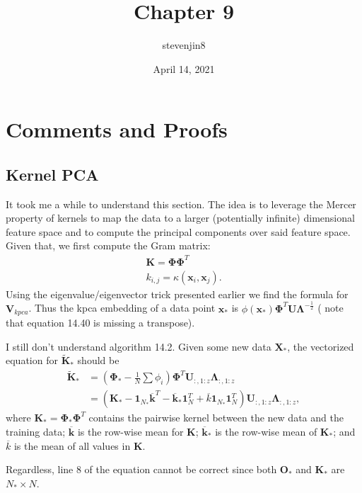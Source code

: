 \documentclass[a4paper,11pt]{article}
\title{Chapter 9}
\author{stevenjin8}
\date{April 14, 2021}
\begin{document}
\maketitle

\section*{Comments and Proofs}
\setcounter{section}{4}
\setcounter{subsection}{3}
\subsection{Kernel PCA}

It took me a while to understand this section. The idea is to leverage the Mercer property of
kernels to map the data to a larger (potentially infinite) dimensional feature space and to compute
the principal components over said feature space. Given that, we first compute the Gram matrix:
\begin{align*}
	\mathbf{K} = \boldsymbol{\Phi} \boldsymbol{\Phi}^T \\
	k_{i,j} = \kappa( \mathbf{x}_i, \mathbf{x}_j ).
\end{align*}
Using the eigenvalue/eigenvector trick presented earlier we find the formula for
$\mathbf{V}_{kpca}$. Thus the kpca embedding of a data point $\mathbf{x}_*$ is
$\phi( \mathbf{x_*} ) \boldsymbol{\Phi}^T \mathbf{U} \boldsymbol{\Lambda} ^ {-\frac12}$ (
note that equation 14.40 is missing a transpose).

I still don't understand algorithm 14.2. Given some new data $\mathbf{X}_*$, the vectorized
equation for $\tilde{\mathbf{K}}_*$ should
be
\begin{align*}
	\tilde{\mathbf{K}}_* &= ( \boldsymbol{\Phi}_* - \frac1N \sum \phi_i ) \boldsymbol{\Phi}^T
	\mathbf{U}_{ :, 1:z } \boldsymbol{\Lambda}_{ :, 1:z } \\
	&= \left(
		\mathbf{K}_* - \mathbf1_{N_*} \overline{\mathbf{k}}^T
		- \overline{\mathbf{k}}_* \mathbf{1}_N^T
		+ \overline{k} \mathbf{1}_{N_*} \mathbf{1}_{N}^T
	\right)
	\mathbf{U}_{:, 1: z} \boldsymbol{\Lambda}_{:, 1:z},
\end{align*}
where $\mathbf{K}_* = \boldsymbol{\Phi}_* \boldsymbol{\Phi}^T$ contains the pairwise kernel between
the new data and the training data; $\overline{\mathbf{k}}$ is the row-wise mean for $\mathbf{K}$;
$\overline{\mathbf{k}}_*$ is the row-wise mean of $\mathbf{K}_*$; and $\overline{k}$ is the
mean of all values in $\mathbf{K}$.

Regardless, line 8 of the equation cannot be correct since both $\mathbf{O}_*$ and $\mathbf{K}_*$
are $N_* \times N$.
\end{document}
